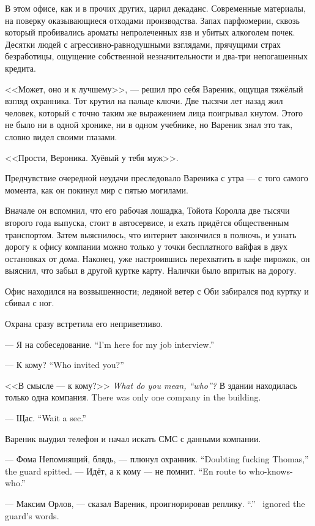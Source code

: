 В этом офисе, как и в прочих других, царил декаданс.
Современные материалы, на поверку оказывающиеся отходами производства.
Запах парфюмерии, сквозь который пробивались ароматы непролеченных язв и убитых алкоголем почек.
Десятки людей с агрессивно-равнодушными взглядами, прячущими страх безработицы, ощущение собственной незначительности и два-три непогашенных кредита.

<<Может, оно и к лучшему>>, --- решил про себя Вареник, ощущая тяжёлый взгляд охранника.
Тот крутил на пальце ключи.
Две тысячи лет назад жил человек, который с точно таким же выражением лица поигрывал кнутом.
Этого не было ни в одной хронике, ни в одном учебнике, но Вареник знал это так, словно видел своими глазами.

<<Прости, Вероника.
Хуёвый у тебя муж>>.

\asterism

Предчувствие очередной неудачи преследовало Вареника с утра --- с того самого момента, как он покинул мир с пятью могилами.

Вначале он вспомнил, что его рабочая лошадка, Тойота Королла две тысячи второго года выпуска, стоит в автосервисе, и ехать придётся общественным транспортом.
Затем выяснилось, что интернет закончился в полночь, и узнать дорогу к офису компании можно только у точки бесплатного вайфая в двух остановках от дома.
Наконец, уже настроившись перехватить в кафе пирожок, он выяснил, что забыл в другой куртке карту.
Налички было впритык на дорогу.

Офис находился на возвышенности;
ледяной ветер с Оби забирался под куртку и сбивал с ног.

Охрана сразу встретила его неприветливо.

{--- Я на собеседование.}
{``I'm here for my job interview.''}

{--- К кому?}
{``Who invited you?''}

{<<В смысле --- к кому?>>}
{\textit{What do you mean, ``who''?}}
{В здании находилась только одна компания.}
{There was only one company in the building.}

{--- Щас.}
{``Wait a sec.''}

Вареник выудил телефон и начал искать СМС с данными компании.

{--- Фома Непомнящий, блядь, --- плюнул охранник.}
{``Doubting fucking Thomas,'' the guard spitted.}
{--- Идёт, а к кому --- не помнит.}
{``En route to who-knows-who.''}

{--- Максим Орлов, --- сказал Вареник, проигнорировав реплику.}
{``\MaksimOrlov.'' \Varenik\ ignored the guard's words.}

